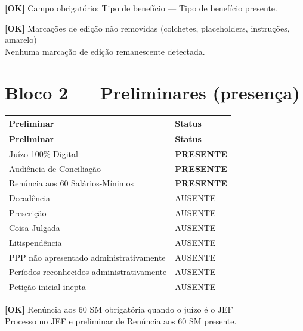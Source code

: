 \documentclass[12pt,a4paper]{article}
\newcommand{\statusOK}[1]{\textcolor{corOK}{\textbf{[OK]}} #1}
\begin{document}
\medskip
\statusOK{Campo obrigatório: Tipo de benefício} --- Tipo de benefício presente.

\medskip
\statusOK{Marcações de edição não removidas (colchetes, placeholders, instruções, amarelo)}\\
Nenhuma marcação de edição remanescente detectada.

\section{Bloco 2 --- Preliminares (presença)}

\begin{longtable}{p{8.5cm} p{4.5cm}}
  \toprule
  \textbf{Preliminar} & \textbf{Status} \\
  \midrule
  \endfirsthead
  \toprule
  \textbf{Preliminar} & \textbf{Status} \\
  \midrule
  \endhead
  Juízo 100\% Digital                           & \textcolor{corOK}{\textbf{PRESENTE}} \\
  Audiência de Conciliação                      & \textcolor{corOK}{\textbf{PRESENTE}} \\
  Renúncia aos 60 Salários-Mínimos              & \textcolor{corOK}{\textbf{PRESENTE}} \\
  Decadência                                    & AUSENTE \\
  Prescrição                                    & AUSENTE \\
  Coisa Julgada                                 & AUSENTE \\
  Litispendência                                & AUSENTE \\
  PPP não apresentado administrativamente       & AUSENTE \\
  Períodos reconhecidos administrativamente     & AUSENTE \\
  Petição inicial inepta                        & AUSENTE \\
  \bottomrule
\end{longtable}

\statusOK{Renúncia aos 60 SM obrigatória quando o juízo é o JEF}\\
Processo no JEF e preliminar de Renúncia aos 60 SM presente.

\end{document}
